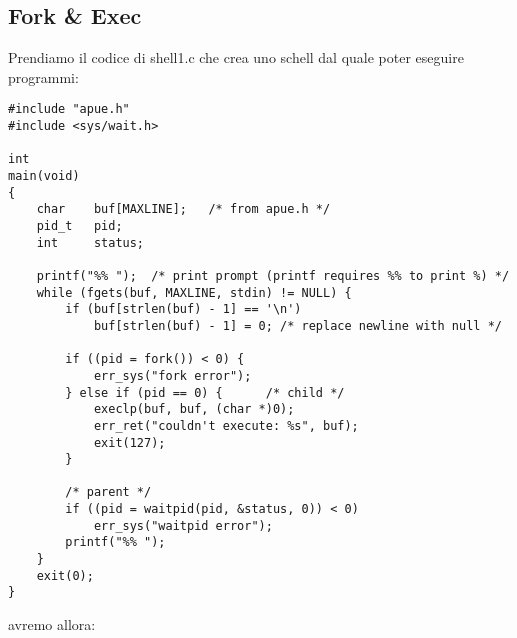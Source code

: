 \subsection{Fork \& Exec}

Prendiamo il codice di shell1.c che crea uno schell dal quale poter eseguire programmi:

\begin{lstlisting}
#include "apue.h"
#include <sys/wait.h>

int
main(void)
{
	char	buf[MAXLINE];	/* from apue.h */
	pid_t	pid;
	int		status;

	printf("%% ");	/* print prompt (printf requires %% to print %) */
	while (fgets(buf, MAXLINE, stdin) != NULL) {
		if (buf[strlen(buf) - 1] == '\n')
			buf[strlen(buf) - 1] = 0; /* replace newline with null */

		if ((pid = fork()) < 0) {
			err_sys("fork error");
		} else if (pid == 0) {		/* child */
			execlp(buf, buf, (char *)0);
			err_ret("couldn't execute: %s", buf);
			exit(127);
		}

		/* parent */
		if ((pid = waitpid(pid, &status, 0)) < 0)
			err_sys("waitpid error");
		printf("%% ");
	}
	exit(0);
}
\end{lstlisting}

avremo allora:

